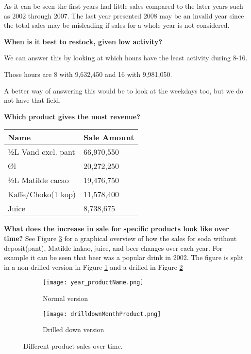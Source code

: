 	As it can be seen the first years had little sales compared to the later years such as 2002 through 2007. The last year presented 2008 may be an invalid
	year since the total sales may be misleading if sales for a whole year is not considered.

	\textbf{When is it best to restock, given low activity?}
	
	We can answer this by looking at which hours have the least activity during 8-16.
	
	Those hours are 8 with 9,632,450 and 16 with 9,981,050.
	
	A better way of answering this would be to look at the weekdays too, but we do not have that field.
	
	\textbf{Which product gives the most revenue?}
	\begin{table}[H]
	    \begin{tabular}{l|l}
	    Name               & Sale Amount \\ \hline
	    ½L Vand excl. pant & 66,970,550  \\
	    Øl                 & 20,272,250  \\
	    ½L Matilde cacao   & 19,476,750  \\
	    Kaffe/Choko(1 kop) & 11,578,400  \\
	    Juice              & 8,738,675   \\
	    \end{tabular}
	\end{table}
	
	\textbf{What does the increase in sale for specific products look like over time?}
	See Figure \ref{fig:yearProduct} for a graphical overview of how the sales for soda without deposit(pant), Matilde kakao, juice, and beer changes over each year. For example it can be seen that beer was a popular drink in 2002. The figure is split in a non-drilled version in Figure \ref{fig:yearProductNormal} and a drilled in Figure \ref{fig:yearProductDrilled}
	
	\begin{figure}
		\begin{subfigure}{.5\textwidth}
			\centering
			\texttt{[image: year\_productName.png]}
			\caption{Normal version}
			\label{fig:yearProductNormal}
		\end{subfigure}
		\begin{subfigure}{.5\textwidth}
			\centering
			\texttt{[image: drilldownMonthProduct.png]}
			\caption{Drilled down version}
			\label{fig:yearProductDrilled}
		\end{subfigure}
		\caption{Different product sales over time.}
		\label{fig:yearProduct}
	\end{figure}
	
